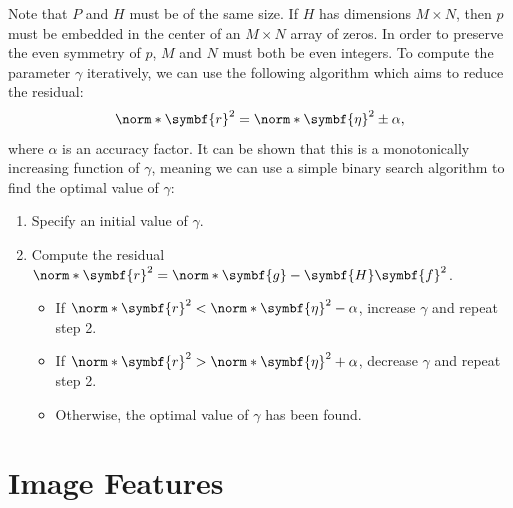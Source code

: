\documentclass{article}
\begin{document}
Note that \(P\) and \(H\) must be of the same size. If \(H\) has
dimensions \(M \times N\), then \(p\) must be embedded in the center of
an \(M \times N\) array of zeros. In order to preserve the even symmetry
of \(p\), \(M\) and \(N\) must both be even integers. To compute the
parameter \(\gamma\) iteratively, we can use the following algorithm
which aims to reduce the residual:
\begin{equation*}
    \norm*{\symbf{r}}^2 = \norm*{\symbf{\eta}}^2 \pm \alpha,
\end{equation*}
where \(\alpha\) is an accuracy factor. It can be shown that this is a
monotonically increasing function of \(\gamma\), meaning we can use a
simple binary search algorithm to find the optimal value of \(\gamma\):
\begin{enumerate}
    \item Specify an initial value of \(\gamma\).
    \item Compute the residual \(\norm*{\symbf{r}}^2 = \norm*{\symbf{g}
          - \symbf{H} \symbf{f}}^2\).
          \begin{itemize}
              \item If \(\norm*{\symbf{r}}^2 < \norm*{\symbf{\eta}}^2 -
                    \alpha\), increase \(\gamma\) and repeat step 2.
              \item If \(\norm*{\symbf{r}}^2 > \norm*{\symbf{\eta}}^2 +
                    \alpha\), decrease \(\gamma\) and repeat step 2.
              \item Otherwise, the optimal value of \(\gamma\) has been
                    found.
          \end{itemize}
\end{enumerate}
\section{Image Features}
\end{document}
